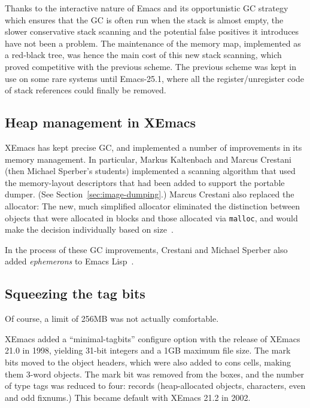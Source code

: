 \documentclass[format=acmsmall, review]{acmart}
\newcommand \Elisp {Emacs Lisp}
\begin{document}
Thanks to the interactive nature of Emacs and its opportunistic GC strategy
which ensures that the GC is often run when the stack is almost empty, the
slower conservative stack scanning and the potential false positives it
introduces have not been a problem.  The maintenance of the memory map,
implemented as a red-black tree, was hence the main cost of this new stack
scanning, which proved competitive with the previous scheme.  The previous
scheme was kept in use on some rare systems until Emacs-25.1, where all the
register/unregister code of stack references could finally be removed.

\subsection{Heap management in XEmacs}
\label{sec:heap-xemacs}

XEmacs has kept precise GC, and implemented a number of improvements
in its memory management.  In particular, Markus Kaltenbach and Marcus
Crestani (then Michael Sperber's students)
implemented a scanning algorithm that used the memory-layout
descriptors that had been added to support the portable dumper.  (See
Section~\ref{sec:image-dumping}.)  Marcus Crestani also replaced the
allocator: The new, much simplified allocator eliminated the
distinction between objects that were allocated in blocks and those
allocated via \texttt{malloc}, and would make the decision
individually based on size~\cite{Crestani2005}.

In the process of these GC improvements, Crestani and Michael Sperber
also added \emph{ephemerons} to \Elisp{}~\cite{Hayes1997}.

\subsection{Squeezing the tag bits}
\label{sec:tag-bits}

Of course, a limit of 256MB was not actually comfortable.

XEmacs added a ``minimal-tagbits'' configure option with the release
of XEmacs 21.0 in 1998, yielding 31-bit integers and a 1GB maximum
file size.  The mark bits moved to the object headers, which were also
added to cons cells, making them 3-word objects.
The mark bit was removed from the boxes, and the number of
type tags was reduced to four: records (heap-allocated objects,
characters, even and odd fixnums.)  This became default with XEmacs
21.2 in 2002.
\end{document}
